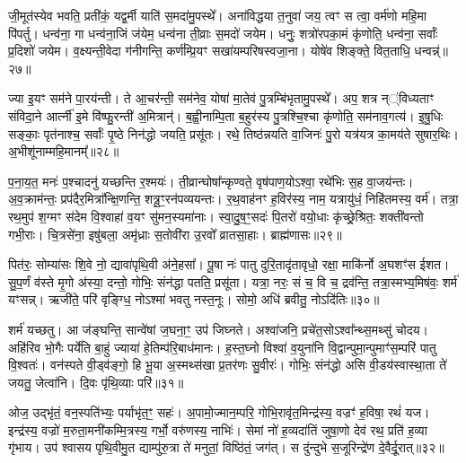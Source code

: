 {\anuvakamend[{अ॒गा॒ꣳ स॒ह॒स्रा॒क्ष॒ दे॒वाः॒ स॒हस्र॑धारा॒मत्यꣳ॑हा॒ अनु॑वर्त्मानः॒ षोड॑श च॥५॥}]}

जी॒मूत॑स्येव भवति॒ प्रती॑कं॒ यद्व॒र्मी याति॑ स॒मदा॑मु॒पस्थे᳚। अना॑विद्धया त॒नुवा॑ जय॒ त्वꣳ स त्वा॒ वर्म॑णो महि॒मा पि॑पर्तु। धन्व॑ना॒ गा धन्व॑ना॒जिं ज॑येम॒ धन्व॑ना ती॒व्राः स॒मदो॑ जयेम। धनुः॒ शत्रो॑रपका॒मं कृ॑णोति॒ धन्व॑ना॒ सर्वाः᳚ प्र॒दिशो॑ जयेम। व॒क्ष्यन्ती॒वेदा ग॑नीगन्ति॒ कर्ण॑म्प्रि॒यꣳ सखा॑यम्परिषस्वजा॒ना। योषे॑व शिङ्क्ते॒ वित॒ताधि॒ धन्वन्न्॑॥२७॥

ज्या इ॒यꣳ सम॑ने पा॒रय॑न्ती। ते आ॒चर॑न्ती॒ सम॑नेव॒ योषा॑ मा॒तेव॑ पु॒त्रम्बि॑भृतामु॒पस्थे᳚। अप॒ शत्र न््॑विध्यताꣳ संविदा॒ने आर्त्नी॑ इ॒मे वि॑ष्फु॒रन्ती॑ अ॒मित्रान्॑। ब॒ह्वी॒नाम्पि॒ता ब॒हुर॑स्य पु॒त्रश्चि॒श्चा कृ॑णोति॒ सम॑नाव॒गत्य॑। इ॒षु॒धिः सङ्काः॒ पृत॑नाश्च॒ सर्वाः᳚ पृ॒ष्ठे निन॑द्धो जयति॒ प्रसू॑तः। रथे॒ तिष्ठ॑न्नयति वा॒जिनः॑ पु॒रो यत्र॑यत्र का॒मय॑ते सुषार॒थिः। अ॒भीशू॑नाम्महि॒मानम्᳚॥२८॥

प॒ना॒य॒त॒ मनः॑ प॒श्चादनु॑ यच्छन्ति र॒श्मयः॑। ती॒व्रान्घोषा᳚न्कृण्वते॒ वृष॑पाण॒यो\-ऽश्वा॒ रथे॑भिः स॒ह वा॒जय॑न्तः। अ॒व॒क्राम॑न्तः॒ प्रप॑दैर॒मित्रा᳚न्क्षि॒णन्ति॒ शत्रू॒ꣳ॒रन॑पव्ययन्तः। र॒थ॒वाह॑नꣳ ह॒विर॑स्य॒ नाम॒ यत्रायु॑धं॒ निहि॑तमस्य॒ वर्म॑। तत्रा॒ रथ॒मुप॑ श॒ग्मꣳ स॑देम वि॒श्वाहा॑ व॒यꣳ सु॑मन॒स्यमा॑नाः। स्वा॒दु॒ष॒ꣳ॒सदः॑ पि॒तरो॑ वयो॒धाः कृ॑च्छ्रे॒श्रितः॒ शक्ती॑वन्तो गभी॒राः। चि॒त्रसे॑ना॒ इषु॑बला॒ अमृ॑ध्राः स॒तोवी॑रा उ॒रवो᳚ व्रातसा॒हाः। ब्राह्म॑णासः॥२९॥

पित॑रः॒ सोम्या॑सः शि॒वे नो॒ द्यावा॑पृथि॒वी अ॑ने॒हसा᳚। पू॒षा नः॑ पातु दुरि॒तादृ॑तावृधो॒ रक्षा॒ माकि॑र्नो अ॒घशꣳ॑स ईशत। सु॒प॒र्णं व॑स्ते मृ॒गो अ॑स्या॒ दन्तो॒ गोभिः॒ संन॑द्धा पतति॒ प्रसू॑ता। यत्रा॒ नरः॒ सं च॒ वि च॒ द्रव॑न्ति॒ तत्रा॒स्मभ्य॒मिष॑वः॒ शर्म॑ यꣳसन्न्। ऋजी॑ते॒ परि॑ वृङ्ग्धि॒ नो\-ऽश्मा॑ भवतु नस्त॒नूः। सोमो॒ अधि॑ ब्रवीतु॒ नो\-ऽदि॑तिः॥३०॥

शर्म॑ यच्छतु। आ ज॑ङ्घन्ति॒ सान्वे॑षां ज॒घना॒ꣳ॒ उप॑ जिघ्नते। अश्वा॑जनि॒ प्रचे॑त॒सो\-ऽश्वा᳚न्थ्स॒मथ्सु॑ चोदय। अहि॑रिव भो॒गैः पर्ये॑ति बा॒हुं ज्याया॑ हे॒तिम्प॑रि॒बाध॑मानः। ह॒स्त॒घ्नो विश्वा॑ व॒युना॑नि वि॒द्वान्पुमा॒न्पुमाꣳ॑स॒म्परि॑ पातु वि॒श्वतः॑। वन॑स्पते वी॒ड्व॑ङ्गो॒ हि भू॒या अ॒स्मथ्स॑खा प्र॒तर॑णः सु॒वीरः॑। गोभिः॒ संन॑द्धो असि वी॒डय॑स्वास्था॒ता ते॑ जयतु॒ जेत्वा॑नि। दि॒वः पृ॑थि॒व्याः परि॑॥३१॥

ओज॒ उद्भृ॑तं॒ वन॒स्पति॑भ्यः॒ पर्याभृ॑त॒ꣳ॒ सहः॑। अ॒पामो॒ज्मान॒म्परि॒ गोभि॒रावृ॑त॒मिन्द्र॑स्य॒ वज्रꣳ॑ ह॒विषा॒ रथं॑ यज। इन्द्र॑स्य॒ वज्रो॑ म॒रुता॒मनी॑कम्मि॒त्रस्य॒ गर्भो॒ वरु॑णस्य॒ नाभिः॑। सेमां नो॑ ह॒व्यदा॑तिं जुषा॒णो देव॑ रथ॒ प्रति॑ ह॒व्या गृ॑भाय। उप॑ श्वासय पृथि॒वीमु॒त द्याम्पु॑रु॒त्रा ते॑ मनुतां॒ विष्ठि॑तं॒ जग॑त्। स दु॑न्दुभे स॒जूरिन्द्रे॑ण दे॒वैर्दू॒रात्॥३२॥

